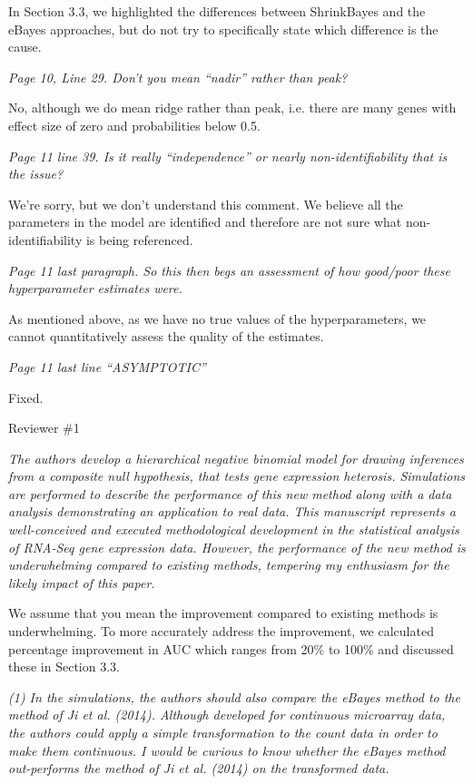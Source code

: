 \documentclass{article}
\newcommand{\comment}[1]{\textit{#1}}
\newcommand{\response}[1]{#1}
\begin{document}
\response{In Section 3.3, we highlighted the differences between ShrinkBayes and the eBayes approaches, but do not try to specifically state which difference is the cause.}

\comment{Page 10, Line 29.  Don’t you mean “nadir” rather than peak?}

\response{No, although we do mean ridge rather than peak, i.e. there are many genes with effect size of zero and probabilities below 0.5.}

\comment{Page 11 line 39.  Is it really “independence” or nearly non-identifiability that is the issue?}

\response{We're sorry, but we don't understand this comment. We believe all the parameters in the model are identified and therefore are not sure what non-identifiability is being referenced.}

\comment{Page 11 last paragraph.  So this then begs an assessment of how good/poor these hyperparameter estimates were.}

\response{As mentioned above, as we have no true values of the hyperparameters, we cannot quantitatively assess the quality of the estimates.}

\comment{Page 11 last line “ASYMPTOTIC”}

\response{Fixed.}

Reviewer \#1

\comment{The authors develop a hierarchical negative binomial model for drawing inferences from a composite null hypothesis, that tests gene expression heterosis. Simulations are performed to describe the performance of this new method along with a data analysis demonstrating an application to real data. This manuscript represents a well-conceived and executed methodological development in the statistical analysis of RNA-Seq gene expression data. However, the performance of the new method is underwhelming compared to existing methods, tempering my enthusiasm for the likely impact of this paper.}

\response{We assume that you mean the improvement compared to existing methods is underwhelming. To more accurately address the improvement, we calculated percentage improvement in AUC which ranges from 20\% to 100\% and discussed these in Section 3.3.}

\comment{(1) In the simulations, the authors should also compare the eBayes method to the method of Ji et al. (2014). Although developed for continuous microarray data, the authors could apply a simple transformation to the count data in order to make them continuous. I would be curious to know whether the eBayes method out-performs the method of Ji et al. (2014) on the transformed data.}
\end{document}
